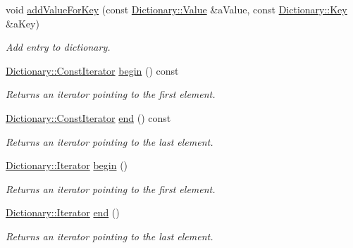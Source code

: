 \begin{DoxyCompactItemize}
$$void \hyperlink{classlibrary_1_1core_1_1ctnr_1_1_dictionary_adea5ef8c3d55b94a219f19cb0100be4b}{add\+Value\+For\+Key} (const \hyperlink{classlibrary_1_1core_1_1ctnr_1_1_object}{Dictionary\+::\+Value} \&a\+Value, const \hyperlink{classlibrary_1_1core_1_1types_1_1_string}{Dictionary\+::\+Key} \&a\+Key)
\begin{DoxyCompactList}\small\item\em Add entry to dictionary. \end{DoxyCompactList}\item 
\hyperlink{classlibrary_1_1core_1_1ctnr_1_1_dictionary_1_1_const_iterator}{Dictionary\+::\+Const\+Iterator} \hyperlink{classlibrary_1_1core_1_1ctnr_1_1_dictionary_a083985702fb77f6c6b06d2bd36325455}{begin} () const
\begin{DoxyCompactList}\small\item\em Returns an iterator pointing to the first element. \end{DoxyCompactList}\item 
\hyperlink{classlibrary_1_1core_1_1ctnr_1_1_dictionary_1_1_const_iterator}{Dictionary\+::\+Const\+Iterator} \hyperlink{classlibrary_1_1core_1_1ctnr_1_1_dictionary_ace2fb3bdb88a059090e8b0265d97e57e}{end} () const
\begin{DoxyCompactList}\small\item\em Returns an iterator pointing to the last element. \end{DoxyCompactList}\item 
\hyperlink{classlibrary_1_1core_1_1ctnr_1_1_dictionary_1_1_iterator}{Dictionary\+::\+Iterator} \hyperlink{classlibrary_1_1core_1_1ctnr_1_1_dictionary_a9a3c1e197db1c8dd4db34a650315eba5}{begin} ()
\begin{DoxyCompactList}\small\item\em Returns an iterator pointing to the first element. \end{DoxyCompactList}\item 
\hyperlink{classlibrary_1_1core_1_1ctnr_1_1_dictionary_1_1_iterator}{Dictionary\+::\+Iterator} \hyperlink{classlibrary_1_1core_1_1ctnr_1_1_dictionary_a16ed18981bcf7ffdc7308801cc4b9d56}{end} ()
\begin{DoxyCompactList}\small\item\em Returns an iterator pointing to the last element. \end{DoxyCompactList}\end{DoxyCompactItemize}
